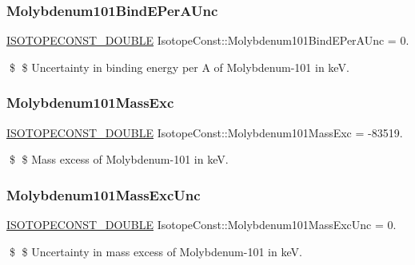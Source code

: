 \subsubsection{\texorpdfstring{Molybdenum101\+Bind\+E\+Per\+A\+Unc}{Molybdenum101BindEPerAUnc}}
{\footnotesize\ttfamily \mbox{\hyperlink{group___isotope_const-_macros_ga8f45a7272ce02c0b4c65c44636ed719a}{I\+S\+O\+T\+O\+P\+E\+C\+O\+N\+S\+T\+\_\+\+D\+O\+U\+B\+LE}} Isotope\+Const\+::\+Molybdenum101\+Bind\+E\+Per\+A\+Unc = 0.}

\$ \$ Uncertainty in binding energy per A of Molybdenum-\/101 in keV. \mbox{\label{group___isotope_const-_molybdenum-_mo101_ga9f8ccffff6e2e210c52c1cb982975516}} 
\subsubsection{\texorpdfstring{Molybdenum101\+Mass\+Exc}{Molybdenum101MassExc}}
{\footnotesize\ttfamily \mbox{\hyperlink{group___isotope_const-_macros_ga8f45a7272ce02c0b4c65c44636ed719a}{I\+S\+O\+T\+O\+P\+E\+C\+O\+N\+S\+T\+\_\+\+D\+O\+U\+B\+LE}} Isotope\+Const\+::\+Molybdenum101\+Mass\+Exc = -\/83519.}

\$ \$ Mass excess of Molybdenum-\/101 in keV. \mbox{\label{group___isotope_const-_molybdenum-_mo101_gad562221323f5782b2936a68812bae9f7}} 
\subsubsection{\texorpdfstring{Molybdenum101\+Mass\+Exc\+Unc}{Molybdenum101MassExcUnc}}
{\footnotesize\ttfamily \mbox{\hyperlink{group___isotope_const-_macros_ga8f45a7272ce02c0b4c65c44636ed719a}{I\+S\+O\+T\+O\+P\+E\+C\+O\+N\+S\+T\+\_\+\+D\+O\+U\+B\+LE}} Isotope\+Const\+::\+Molybdenum101\+Mass\+Exc\+Unc = 0.}

\$ \$ Uncertainty in mass excess of Molybdenum-\/101 in keV. \mbox{\label{group___isotope_const-_molybdenum-_mo101_ga02e47704c892d691b3e7323a0b610c54}} 

